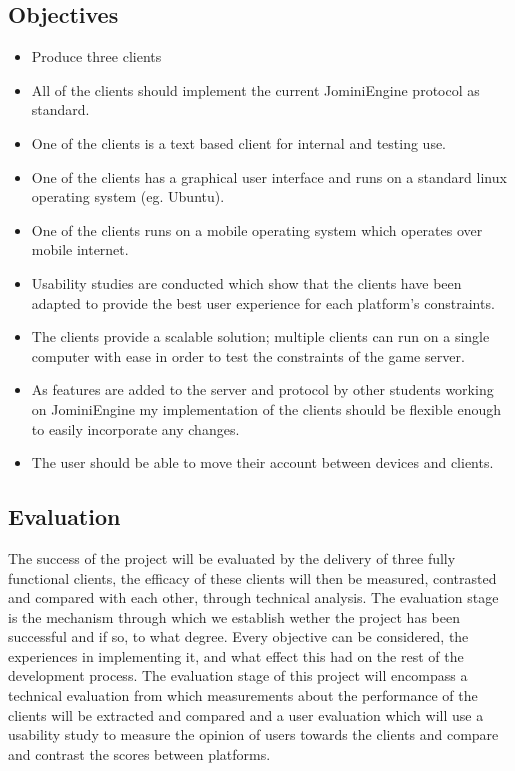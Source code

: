 \documentclass{article}
\begin{document}
	\subsection{Objectives}
	\begin{itemize}
	\item Produce three clients
	\item All of the clients should implement the current JominiEngine protocol as standard.
	\item One of the clients is a text based client for internal and testing use.
	\item One of the clients has a graphical user interface and runs on a standard linux operating system (eg. Ubuntu).
	\item One of the clients runs on a mobile operating system which operates over mobile internet.
	\item Usability studies are conducted which show that the clients have been adapted to provide the best user experience for each platform’s constraints.
	\item The clients provide a scalable solution; multiple clients can run on a single computer with ease in order to test the constraints of the game server.
	\item As features are added to the server and protocol by other students working on JominiEngine my implementation of the clients should be flexible enough to easily incorporate any changes.
	\item The user should be able to move their account between devices and clients.
\end{itemize}
	\subsection{Evaluation}
	The success of the project will be evaluated by the delivery of three fully functional clients, the efficacy of these clients will then be measured, contrasted and compared with each other, through technical analysis. The evaluation stage is the mechanism through which we establish wether the project has been successful and if so, to what degree. Every objective can be considered, the experiences in implementing it, and what effect this had on the rest of the development process. The evaluation stage of this project will encompass a technical evaluation from which measurements about the performance of the clients will be extracted and compared and a user evaluation which will use a usability study to measure the opinion of users towards the clients and compare and contrast the scores between platforms. 
\end{document}

